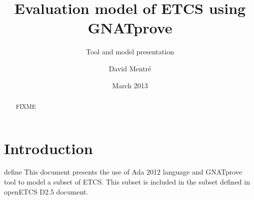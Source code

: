 \documentclass{template/openetcs_report}
\begin{document}
\frontmatter
{}




\title{Evaluation model of ETCS using GNATprove}

\subtitle{Tool and model presentation}

\date{March 2013}

\author{David Mentré}





\begin{abstract}
  FIXME
\end{abstract}

\maketitle
\tableofcontents
\listoffiguresandtables


\mainmatter

\chapter{Introduction}
 define
This document presents the use of Ada 2012 language and GNATprove tool
to model a subset of ETCS. This subset is included in the subset
defined in openETCS D2.5 document\cite{openetcs:D2.5}.
\end{document}
